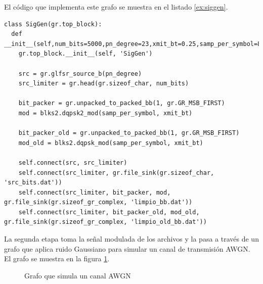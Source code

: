 El c\'odigo que implementa este grafo se muestra en el listado \ref{ex:siggen}.

\begin{lstlisting}[float, label=ex:siggen, caption={C\'odigo que implementa el grafo
generador de se\~nales.}, breaklines=true]
class SigGen(gr.top_block):
  def __init__(self,num_bits=5000,pn_degree=23,xmit_bt=0.25,samp_per_symbol=8):
    gr.top_block.__init__(self, 'SigGen')
	
	src = gr.glfsr_source_b(pn_degree)
	src_limiter = gr.head(gr.sizeof_char, num_bits)

    bit_packer = gr.unpacked_to_packed_bb(1, gr.GR_MSB_FIRST)
    mod = blks2.dqpsk2_mod(samp_per_symbol, xmit_bt)

    bit_packer_old = gr.unpacked_to_packed_bb(1, gr.GR_MSB_FIRST)
    mod_old = blks2.dqpsk_mod(samp_per_symbol, xmit_bt)

    self.connect(src, src_limiter)
    self.connect(src_limiter, gr.file_sink(gr.sizeof_char, 'src_bits.dat'))
    self.connect(src_limiter, bit_packer, mod, gr.file_sink(gr.sizeof_gr_complex, 'limpio_bb.dat'))
    self.connect(src_limiter, bit_packer_old, mod_old, gr.file_sink(gr.sizeof_gr_complex, 'limpio_old_bb.dat'))
\end{lstlisting}

La segunda etapa toma la se\~nal modulada de los archivos y la pasa a trav\'es de un grafo que
aplica ruido Gaussiano para simular un canal de transmisi\'on AWGN. El grafo se muestra en la figura
\ref{fig:noisegen}.

\begin{figure}[htp]
  \centering
  \vspace{0.3in}
  \vspace{0.3in}
  \caption{Grafo que simula un canal AWGN}
  \label{fig:noisegen}
\end{figure}


